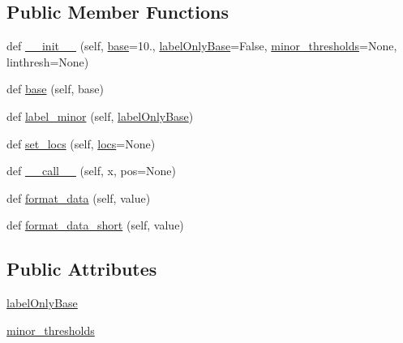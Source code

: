 \subsection*{Public Member Functions}
\begin{DoxyCompactItemize}
\item 
def \hyperlink{classmatplotlib_1_1ticker_1_1LogFormatter_a4d25714f8e214f2ed67cd2f4ec83f292}{\+\_\+\+\_\+init\+\_\+\+\_\+} (self, \hyperlink{classmatplotlib_1_1ticker_1_1LogFormatter_a507d19cbe228689e4658c98d73328136}{base}=10., \hyperlink{classmatplotlib_1_1ticker_1_1LogFormatter_a7bc43fd53bbbd340f532123f83bcab3c}{label\+Only\+Base}=False, \hyperlink{classmatplotlib_1_1ticker_1_1LogFormatter_a8deb464d46fb5534e9a7ec6df8296c3a}{minor\+\_\+thresholds}=None, linthresh=None)
\item 
def \hyperlink{classmatplotlib_1_1ticker_1_1LogFormatter_a507d19cbe228689e4658c98d73328136}{base} (self, base)
\item 
def \hyperlink{classmatplotlib_1_1ticker_1_1LogFormatter_a8161302a1fe9578b01a1214dff788f6f}{label\+\_\+minor} (self, \hyperlink{classmatplotlib_1_1ticker_1_1LogFormatter_a7bc43fd53bbbd340f532123f83bcab3c}{label\+Only\+Base})
\item 
def \hyperlink{classmatplotlib_1_1ticker_1_1LogFormatter_a22b3717775e4efe8ce4c0ee0621ad29a}{set\+\_\+locs} (self, \hyperlink{classmatplotlib_1_1ticker_1_1Formatter_a2b5924640e2c85567e80f40931f7bbf8}{locs}=None)
\item 
def \hyperlink{classmatplotlib_1_1ticker_1_1LogFormatter_ae74f4e71079473c2d1d086951a44b834}{\+\_\+\+\_\+call\+\_\+\+\_\+} (self, x, pos=None)
\item 
def \hyperlink{classmatplotlib_1_1ticker_1_1LogFormatter_a7b27ed8889f9464ba7e5ef33f8952ccf}{format\+\_\+data} (self, value)
\item 
def \hyperlink{classmatplotlib_1_1ticker_1_1LogFormatter_aa272aa795ced91566cb57872a9d3b439}{format\+\_\+data\+\_\+short} (self, value)
\end{DoxyCompactItemize}
\subsection*{Public Attributes}
\begin{DoxyCompactItemize}
\item 
\hyperlink{classmatplotlib_1_1ticker_1_1LogFormatter_a7bc43fd53bbbd340f532123f83bcab3c}{label\+Only\+Base}
\item 
\hyperlink{classmatplotlib_1_1ticker_1_1LogFormatter_a8deb464d46fb5534e9a7ec6df8296c3a}{minor\+\_\+thresholds}
\end{DoxyCompactItemize}
